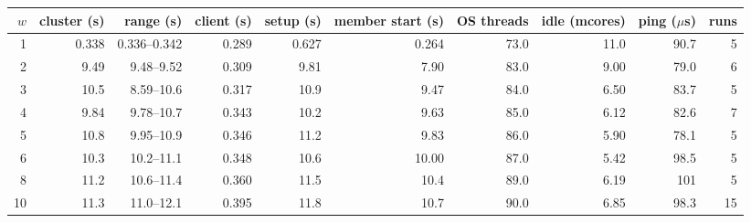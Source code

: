 \begin{tabular}{rrrrrrrrrr}
\toprule
$w$ & cluster (s) & range (s) & client (s) & setup (s) & member start (s) & OS threads & idle (mcores) & ping ($\mu$s) & runs \\
\midrule
1 & 0.338 & 0.336--0.342 & 0.289 & 0.627 & 0.264 & 73.0 & 11.0 & 90.7 & 5 \\
2 & 9.49 & 9.48--9.52 & 0.309 & 9.81 & 7.90 & 83.0 & 9.00 & 79.0 & 6 \\
3 & 10.5 & 8.59--10.6 & 0.317 & 10.9 & 9.47 & 84.0 & 6.50 & 83.7 & 5 \\
4 & 9.84 & 9.78--10.7 & 0.343 & 10.2 & 9.63 & 85.0 & 6.12 & 82.6 & 7 \\
5 & 10.8 & 9.95--10.9 & 0.346 & 11.2 & 9.83 & 86.0 & 5.90 & 78.1 & 5 \\
6 & 10.3 & 10.2--11.1 & 0.348 & 10.6 & 10.00 & 87.0 & 5.42 & 98.5 & 5 \\
8 & 11.2 & 10.6--11.4 & 0.360 & 11.5 & 10.4 & 89.0 & 6.19 & 101 & 5 \\
10 & 11.3 & 11.0--12.1 & 0.395 & 11.8 & 10.7 & 90.0 & 6.85 & 98.3 & 15 \\
\bottomrule
\end{tabular}
\par{}
